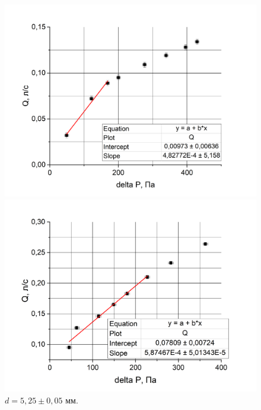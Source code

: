 \documentclass[a4paper,12pt]{article} %
\begin{document}
\begin{figure}[h!]
\begin{center}
\begin{minipage}[h]{0.45\linewidth}
\includegraphics[width=1.2\linewidth]{1d1}
\caption{$d = 3,90 \pm 0,05 \text{ мм}$.} %
\label{ris:experimoriginal} %
\end{minipage}
\hfill
\begin{minipage}[h]{0.45\linewidth}
\includegraphics[width=1.2\linewidth]{1d2}
\caption{$d = 5,25 \pm 0,05 \text{ мм}$.}
\end{minipage}
\end{center}
\end{figure}
\end{document}
